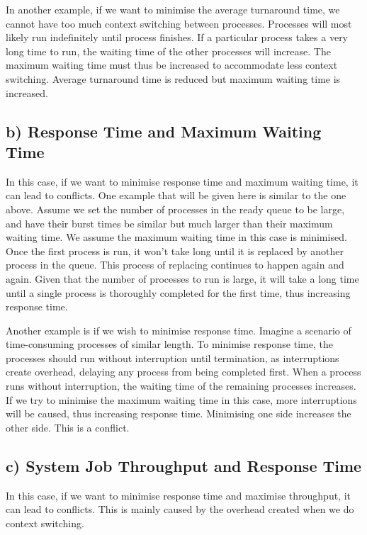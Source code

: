 \documentclass[../main.tex]{subfiles}
\begin{document}
In another example, if we want to minimise the average turnaround time, we cannot have too much context switching between processes. Processes will most likely run indefinitely until process finishes. If a particular process takes a very long time to run, the waiting time of the other processes will increase. The maximum waiting time must thus be increased to accommodate less context switching. Average turnaround time is reduced but maximum waiting time is increased.

\subsection*{b) Response Time and Maximum Waiting Time}

In this case, if we want to minimise response time and maximum waiting time, it can lead to conflicts. 
One example that will be given here is similar to the one above. Assume we set the number of processes in the ready queue to be large, and have their burst times be similar but much larger than their maximum waiting time. We assume the maximum waiting time in this case is minimised. Once the first process is run, it won’t take long until it is replaced by another process in the queue. This process of replacing continues to happen again and again. Given that the number of processes to run is large, it will take a long time until a single process is thoroughly completed for the first time, thus increasing response time.

Another example is if we wish to minimise response time. Imagine a scenario of time-consuming processes of similar length. To minimise response time, the processes should run without interruption until termination, as interruptions create overhead, delaying any process from being completed first. When a process runs without interruption, the waiting time of the remaining processes increases. If we try to minimise the maximum waiting time in this case, more interruptions will be caused, thus increasing response time. Minimising one side increases the other side. This is a conflict.


\subsection*{c) System Job Throughput and Response Time}

In this case, if we want to minimise response time and maximise throughput, it can lead to conflicts. This is mainly caused by the overhead created when we do context switching.
\end{document}

